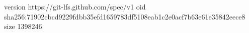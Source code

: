 version https://git-lfs.github.com/spec/v1
oid sha256:71902cbcd9229fdbb35efd1659783df5108eab1c2e0acf7b63e61e35842eece8
size 1398246
